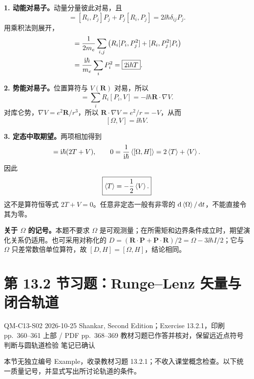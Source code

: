 \begin{checkedsolution}
\textbf{1. 动能对易子。}动量分量彼此对易，且
\begin{equation}
  [R_i,P_j^2]=[R_i,P_j]P_j+P_j[R_i,P_j]
    =2\ii\hbar\delta_{ij}P_j.
\end{equation}
用乘积法则展开，
\begin{align}
  [\Omega,T]
   &=\frac1{2m_e}\sum_{i,j}
      \left(R_i[P_i,P_j^2]+[R_i,P_j^2]P_i\right)\notag\\
   &=\frac{\ii\hbar}{m_e}\sum_iP_i^2
    =\boxed{2\ii\hbar T}.
\end{align}

\textbf{2. 势能对易子。}位置算符与 $V(\mathbf R)$ 对易，所以
\begin{equation}
  [\Omega,V]=\sum_iR_i[P_i,V]
    =-\ii\hbar\mathbf R\cdot\nabla V.
\end{equation}
对库仑势，$\nabla V=e^2\mathbf R/r^3$，所以
$\mathbf R\cdot\nabla V=e^2/r=-V$，从而
\begin{equation}
  \boxed{[\Omega,V]=\ii\hbar V.}
\end{equation}

\textbf{3. 定态中取期望。}两项相加得到
\begin{equation}
  [\Omega,H]=\ii\hbar(2T+V),\qquad
  0=\frac1{\ii\hbar}\expect{[\Omega,H]}
    =2\expect T+\expect V.
\end{equation}
因此
\begin{equation}
  \boxed{\left\langle T \right\rangle=-\frac12\left\langle V \right\rangle.}
\end{equation}
这不是算符恒等式 $2T+V=0$。任意非定态一般有非零的 $\mathop{}\!\mathrm{d}\left\langle \Omega \right\rangle/\mathop{}\!\mathrm{d} t$，不能直接令其为零。

\textbf{关于 $\Omega$ 的记号。}本题不要求 $\Omega$ 是可观测量；在所需矩和边界条件成立时，期望演化关系仍适用。也可采用对称化的
$D=(\mathbf R\cdot\mathbf P+\mathbf P\cdot\mathbf R)/2
=\Omega-3\ii\hbar I/2$；它与 $\Omega$ 只差常数倍单位算符，故 $[D,H]=[\Omega,H]$，结论相同。
\end{checkedsolution}

\section{第 13.2 节习题：Runge--Lenz 矢量与闭合轨道}
\label{exercises:QM-C13-S02}
\exercisemeta
  {QM-C13-S02}
  {2026-10-25}
  {Shankar, Second Edition；Exercise 13.2.1，印刷 pp.~360--361 上部 / PDF pp.~368--369}
  {教材习题已作答并核对，保留远近点符号判断与圆轨道检验}
  {笔记已确认}

本节无独立编号 Example，收录教材习题 13.2.1；不收入课堂概念检查。以下统一质量记号，并显式写出所讨论轨道的条件。

